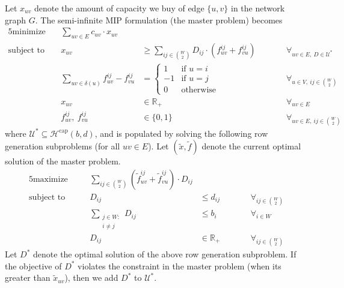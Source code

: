 \documentclass[11pt]{article}
\begin{document}
    Let $x_{uv}$ denote the amount of capacity we buy of edge $\{u,v\}$ in the network graph $G$.
    The semi-infinite MIP formulation (the master problem) becomes
    \begin{alignat*}{5}
        \text{minimize}\ && \sum_{uv \in E} c_{uv} \cdot x_{uv} &&& \\
        \text{subject to}\ && x_{uv} &\ge \sum_{ij \in \binom{W}{2}} D_{ij} \cdot (f_{uv}^{ij} + f_{vu}^{ij}) &&\qquad \forall_{uv \in E,\ D \in \mathcal U^*} \\
        && \sum_{uv \in \delta(u)} f_{uv}^{ij} - f_{vu}^{ij} &= \begin{cases}
                                     1 & \text{if $u = i$} \\
                                     -1 & \text{if $u = j$} \\
                                     0 & \text{otherwise}
        \end{cases} &&\qquad \forall_{u \in V,\ ij \in \binom{W}{2}} \\
        && x_{uv} &\in \mathbb{R}_+ &&\qquad \forall_{uv \in E} \\
        && f_{uv}^{ij},\ f_{vu}^{ij} &\in \{ 0, 1 \} &&\qquad \forall_{uv \in E,\ ij \in \binom{W}{2}}
    \end{alignat*}
    where $\mathcal U^* \subseteq \mathcal H^\text{cap}(b, d)$, and is populated by solving the following row generation subproblems (for all $uv \in E$).
    Let $(\tilde x, \tilde f)$ denote the current optimal solution of the master problem.
    \begin{alignat*}{5}
        \text{maximize}\quad && \sum_{ij \in \binom{W}{2}} (\tilde f_{uv}^{ij} + \tilde f_{vu}^{ij}) \cdot D_{ij} &&& \\
        \text{subject to}\quad && D_{ij} &\le d_{ij} &&\qquad \forall_{ij \in \binom W 2} \\
        && \sum_{\substack{j \in W:\\i \neq j}} D_{ij} &\le b_i &&\qquad \forall_{i \in W} \\
        && D_{ij} &\in \mathbb{R}_+ &&\qquad \forall_{ij \in \binom{W}{2}}
    \end{alignat*}
    Let $D^*$ denote the optimal solution of the above row generation subproblem.
    If the objective of $D^*$ violates the constraint in the master problem (when its greater than $\tilde x_{uv}$), then we add $D^*$ to $\mathcal U^*$.
\end{document}
